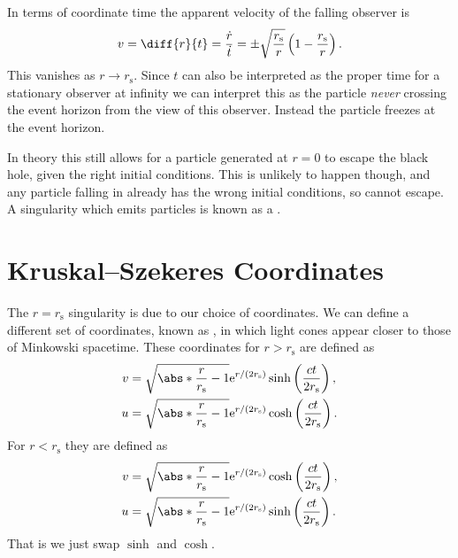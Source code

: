 \documentclass[fleqn]{NotesClass}
\newcommand*{\e}{\mathrm{e}}
\begin{document}
    In terms of coordinate time the apparent velocity of the falling observer is
    \begin{equation}
        v = \diff{r}{t} = \frac{\dot{r}}{\dot{t}} = \pm \sqrt{\frac{r_{\mathrm{s}}}{r}}\left( 1 - \frac{r_{\mathrm{s}}}{r} \right).
    \end{equation}
    This vanishes as \(r \to r_{\mathrm{s}}\).
    Since \(t\) can also be interpreted as the proper time for a stationary observer at infinity we can interpret this as the particle \emph{never} crossing the event horizon from the view of this observer.
    Instead the particle freezes at the event horizon.
    
    In theory this still allows for a particle generated at \(r = 0\) to escape the black hole, given the right initial conditions.
    This is unlikely to happen though, and any particle falling in already has the wrong initial conditions, so cannot escape.
    A singularity which emits particles is known as a .
    
    \section{Kruskal--Szekeres Coordinates}
    The \(r = r_{\mathrm{s}}\) singularity is due to our choice of coordinates.
    We can define a different set of coordinates, known as , in which light cones appear closer to those of Minkowski spacetime.
    These coordinates for \(r > r_{\mathrm{s}}\) are defined as
    \begin{align}
        v &= \sqrt{\abs*{\frac{r}{r_{\mathrm{s}}} - 1}} \e^{r/(2r_{\mathrm{s}})} \sinh\left( \frac{ct}{2r_{\mathrm{s}}} \right),\\
        u &= \sqrt{\abs*{\frac{r}{r_{\mathrm{s}}} - 1}} \e^{r/(2r_{\mathrm{s}})} \cosh\left( \frac{ct}{2r_{\mathrm{s}}} \right).
    \end{align}
    For \(r < r_{\mathrm{s}}\) they are defined as
    \begin{align}
        v &= \sqrt{\abs*{\frac{r}{r_{\mathrm{s}}} - 1}} \e^{r/(2r_{\mathrm{s}})} \cosh\left( \frac{ct}{2r_{\mathrm{s}}} \right),\\
        u &= \sqrt{\abs*{\frac{r}{r_{\mathrm{s}}} - 1}} \e^{r/(2r_{\mathrm{s}})} \sinh\left( \frac{ct}{2r_{\mathrm{s}}} \right).
    \end{align}
    That is we just swap \(\sinh\) and \(\cosh\).
    
\end{document}
